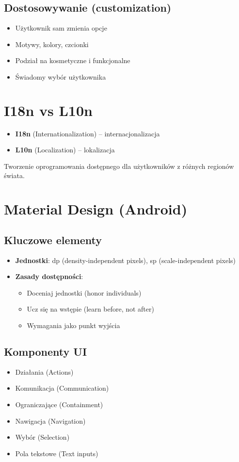 \subsection{Dostosowywanie (customization)}
\begin{itemize}
    \item Użytkownik sam zmienia opcje
    \item Motywy, kolory, czcionki
    \item Podział na kosmetyczne i funkcjonalne
    \item Świadomy wybór użytkownika
\end{itemize}

\section{I18n vs L10n}

\begin{itemize}
    \item \textbf{I18n} (Internationalization) -- internacjonalizacja
    \item \textbf{L10n} (Localization) -- lokalizacja
\end{itemize}

Tworzenie oprogramowania dostępnego dla użytkowników z różnych regionów świata.

\section{Material Design (Android)}

\subsection{Kluczowe elementy}
\begin{itemize}
    \item \textbf{Jednostki}: dp (density-independent pixels), sp (scale-independent pixels)
    \item \textbf{Zasady dostępności}:
    \begin{itemize}
        \item Doceniaj jednostki (honor individuals)
        \item Ucz się na wstępie (learn before, not after)  
        \item Wymagania jako punkt wyjścia
    \end{itemize}
\end{itemize}

\subsection{Komponenty UI}
\begin{itemize}
    \item Działania (Actions)
    \item Komunikacja (Communication)
    \item Ograniczające (Containment)
    \item Nawigacja (Navigation)
    \item Wybór (Selection)
    \item Pola tekstowe (Text inputs)
\end{itemize}

